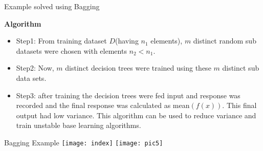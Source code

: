 \documentclass[13pt]{beamer}
\begin{document}
\begin{frame}{Example solved using Bagging}
\begin{block}{\large \textbf{Algorithm}}
\begin{itemize}
\item Step1: From training dataset $D$(having $n_1$ elements), $m$ distinct random sub datasets were chosen with elements $n_2<n_1$.
\item Step2: Now, $m$ distinct decision trees were trained using these $m$ distinct sub data sets.
\item Step3: after training the decision trees were fed input and response was recorded and the final response was calculated as mean$(f(x))$. This final output had low variance. This algorithm can be used to reduce variance and train unstable base learning algorithms.



\end{itemize}
\end{block}


\end{frame}

\begin{frame}{Bagging Example}
\texttt{[image: index]} \vspace*{5mm}
\texttt{[image: pic5]}
\end{frame}
\end{document}
